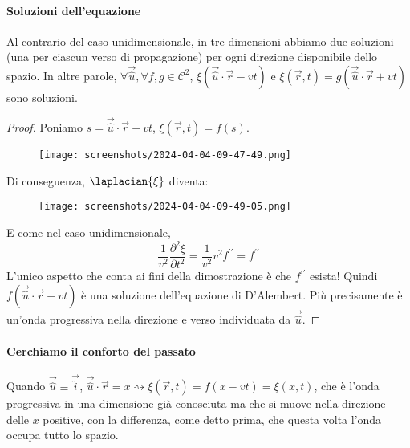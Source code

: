 \paragraph{Soluzioni dell'equazione}
Al contrario del caso unidimensionale, in tre dimensioni abbiamo due soluzioni (una per ciascun verso di propagazione) per ogni direzione disponibile dello spazio. In altre parole, \(\forall \vec{\hat{u}}, \forall f,g \in \mathcal{C} ^{2}  \), \(\xi (\vec{\hat{u}} \cdot \vec{r} - vt )\) e \(\xi (\vec{r} , t)= g(\vec{\hat{u}} \cdot \vec{r} + vt)\) sono soluzioni.
\begin{proof}
	Poniamo \(s=\vec{\hat{u}} \cdot \vec{r} - vt \), \(\xi (\vec{r}, t)=f(s)\).
	\begin{figure}[H]
		\centering
		\texttt{[image: screenshots/2024-04-04-09-47-49.png]}
	\end{figure}
	Di conseguenza, \(\laplacian{\xi } \) diventa:
	\begin{figure}[H]
		\centering
		\texttt{[image: screenshots/2024-04-04-09-49-05.png]}
	\end{figure}
	E come nel caso unidimensionale,
	\[
		\frac{1}{v^{2} }\frac{\partial ^{2} \xi }{\partial t^{2} } = \frac{1}{v^{2} } v^{2} f^{\prime\prime} = f^{\prime\prime} 
	\]
	L'unico aspetto che conta ai fini della dimostrazione è che \(f^{\prime\prime} \) esista! Quindi \(f(\vec{\hat{u}} \cdot \vec{r} - vt)\) è una soluzione dell'equazione di D'Alembert. Più precisamente è un'onda progressiva nella direzione e verso individuata da \(\vec{\hat{u}}\).
\end{proof}

\paragraph{Cerchiamo il conforto del passato}
Quando \(\vec{\hat{u}} \equiv \vec{\hat{i}} \), \(\vec{\hat{u}} \cdot \vec{r} = x \rightsquigarrow \xi (\vec{r},t ) = f(x-vt) = \xi (x,t)\), che è l'onda progressiva in una dimensione già conosciuta ma che si muove nella direzione delle \(x\) positive, con la differenza, come detto prima, che questa volta l'onda occupa tutto lo spazio.

